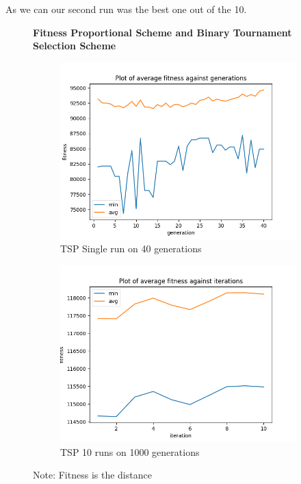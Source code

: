 \documentclass[a4paper]{exam}
\begin{document}
\begin{questions}
  As we can our second run was the best one out of the 10.

  \begin{figure}[H]
    \centering
    \textbf{Fitness Proportional Scheme and Binary Tournament Selection Scheme}
    \begin{subfigure}{.5\textwidth}
      \centering
      \includegraphics[width=1\linewidth]{images/tsp_fps_bt_gen.png}
      \caption{TSP Single run on 40 generations}
      \label{fig:tsp_fps_bt_sub1}
    \end{subfigure}%
    \begin{subfigure}{.5\textwidth}
      \centering
      \includegraphics[width=1\linewidth]{images/tsp_fps_bt_itr.png}
      \caption{TSP 10 runs on 1000 generations}
      \label{fig:tsp_fps_bt_sub2}
    \end{subfigure}
    \caption{Note: Fitness is the distance}
    \label{fig:tsp_fps_bt}
  \end{figure}


\end{questions}
\end{document}
